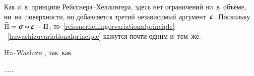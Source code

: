 \begin{otherlanguage}{russian}
Как и~в~принципе Рейсснера\hbox{--}Хеллингера, здесь нет ограничений ни~в~объёме, ни~на~поверхности, но добавляется третий независимый аргумент~$\infinitesimaldeformation$.
Поскольку ${\widehat{\potential} = \linearstress \dotdotp \infinitesimaldeformation - \potential}$, то~\eqref{reissnerhellingervariationalprinciple} ~\eqref{huwashizuvariationalprinciple} кажутся почти одним и~тем~же.

 Hu\hbox{--}Washizu   , так~как

.....

\end{otherlanguage}
